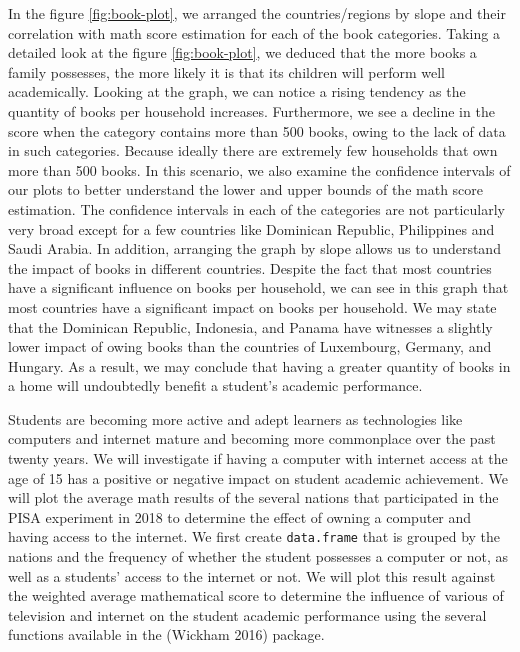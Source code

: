 In the figure \ref{fig:book-plot}, we arranged the countries/regions by slope and their correlation with math score estimation for each of the book categories. Taking a detailed look at the figure \ref{fig:book-plot}, we deduced that the more books a family possesses, the more likely it is that its children will perform well academically. Looking at the graph, we can notice a rising tendency as the quantity of books per household increases. Furthermore, we see a decline in the score when the category contains more than 500 books, owing to the lack of data in such categories. Because ideally there are extremely few households that own more than 500 books. In this scenario, we also examine the confidence intervals of our plots to better understand the lower and upper bounds of the math score estimation. The confidence intervals in each of the categories are not particularly very broad except for a few countries like Dominican Republic, Philippines and Saudi Arabia. In addition, arranging the graph by slope allows us to understand the impact of books in different countries. Despite the fact that most countries have a significant influence on books per household, we can see in this graph that most countries have a significant impact on books per household. We may state that the Dominican Republic, Indonesia, and Panama have witnesses a slightly lower impact of owing books than the countries of Luxembourg, Germany, and Hungary. As a result, we may conclude that having a greater quantity of books in a home will undoubtedly benefit a student's academic performance.

Students are becoming more active and adept learners as technologies like computers and internet mature and becoming more commonplace over the past twenty years. We will investigate if having a computer with internet access at the age of 15 has a positive or negative impact on student academic achievement. We will plot the average math results of the several nations that participated in the PISA experiment in 2018 to determine the effect of owning a computer and having access to the internet. We first create \texttt{data.frame} that is grouped by the nations and the frequency of whether the student possesses a computer or not, as well as a students' access to the internet or not. We will plot this result against the weighted average mathematical score to determine the influence of various of television and internet on the student academic performance using the several functions available in the  (Wickham 2016) package.

